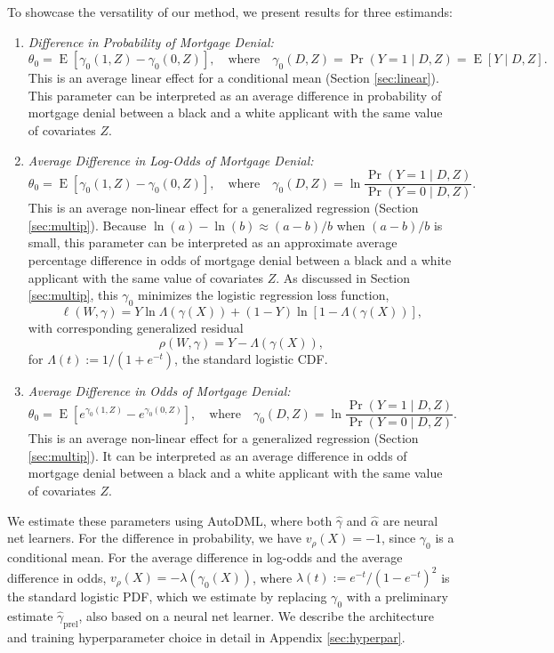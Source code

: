 \documentclass[aos]{imsart}
\numberwithin{equation}{section}
\theoremstyle{plain}
\theoremstyle{remark}
\DeclareMathOperator{\E}{E}
\begin{document}
To showcase the versatility of our method, we present results for three estimands:
\begin{enumerate}
    \item \textit{Difference in Probability of Mortgage Denial:}
    \[\theta_0 = \E[\gamma_0(1, Z) - \gamma_0(0, Z)], \quad \text{where} \quad \gamma_0(D, Z) = \Pr(Y = 1 \mid D, Z) = \E[Y \mid D, Z].\]
    This is an average linear effect for a conditional mean (Section \ref{sec:linear}). This parameter can be interpreted as an average difference in probability of mortgage denial between a black and a white applicant with the same value of covariates $Z$.

    \vspace{0.5em}
    \item \textit{Average Difference in Log-Odds of Mortgage Denial:}
    \[\theta_0 = \E[\gamma_0(1, Z) - \gamma_0(0, Z)], \quad \text{where} \quad \gamma_0(D, Z) = \ln \frac{\Pr(Y = 1 \mid D, Z)}{\Pr(Y = 0 \mid D, Z)}.\]
    This is an average non-linear effect for a generalized regression (Section \ref{sec:multip}). Because $\ln(a) - \ln(b) \approx (a-b)/b$ when $(a-b)/b$ is small, this parameter can be interpreted as an approximate average percentage difference in odds of mortgage denial between a black and a white applicant with the same value of covariates $Z$. As discussed in Section \ref{sec:multip}, this $\gamma_0$ minimizes the logistic regression loss function,
    \[\ell(W, \gamma) = Y \ln \Lambda(\gamma(X)) + (1 - Y) \ln [1 - \Lambda(\gamma(X))],\]
    with corresponding generalized residual
    \[\rho(W, \gamma) = Y - \Lambda(\gamma(X)),\]
    for $\Lambda(t) := 1/(1 + e^{-t})$, the standard logistic CDF.

    \vspace{0.5em}
    \item \textit{Average Difference in Odds of Mortgage Denial:}
    \[\theta_0 = \E[e^{\gamma_0(1, Z)} - e^{\gamma_0(0, Z)}], \quad \text{where} \quad \gamma_0(D, Z) = \ln \frac{\Pr(Y = 1 \mid D, Z)}{\Pr(Y = 0 \mid D, Z)}.\]
    This is an average non-linear effect for a generalized regression (Section \ref{sec:multip}). It can be interpreted as an average difference in odds of mortgage denial between a black and a white applicant with the same value of covariates $Z$.
\end{enumerate}

We estimate these parameters using AutoDML, where both $\hat{\gamma}$ and $\hat{\alpha}$ are neural net learners. For the difference in probability, we have $v_\rho(X) = -1$, since $\gamma_0$ is a conditional mean. For the average difference in log-odds and the average difference in odds, $v_\rho(X) = -\lambda(\gamma_0(X))$, where $\lambda(t) := e^{-t}/(1 - e^{-t})^2$ is the standard logistic PDF, which we estimate by replacing $\gamma_0$ with a preliminary estimate $\hat\gamma_{\text{prel}}$, also based on a neural net learner. We describe the architecture and training hyperparameter choice in detail in Appendix \ref{sec:hyperpar}.
\end{document}
